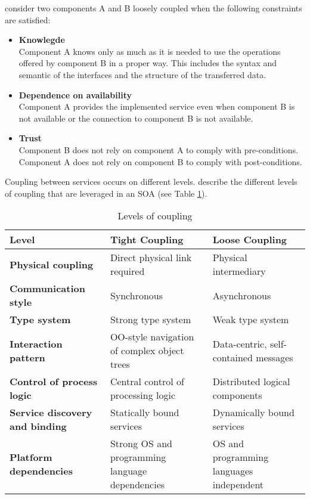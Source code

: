 \citet{Engels:2008nr} consider two components A and B loosely coupled when the following constraints are satisfied:
\begin{itemize}
	\item \textbf{Knowlegde}\\
	Component A knows only as much as it is needed to use the operations offered by component B in a proper way. This includes the syntax and semantic of the interfaces and the structure of the transferred data.
	\item \textbf{Dependence on availability}\\
	Component A provides the implemented service even when component B is not available or the connection to component B is not available.
	\item \textbf{Trust}\\
	Component B does not rely on component A to comply with pre-conditions. Component A does not rely on component B to comply with post-conditions.
\end{itemize}

Coupling between services occurs on different levels. \citet{Krafzig:2005zc} describe the different levels of coupling that are leveraged in an \ac{SOA} (see Table \ref{table:ch02_coupling}).

\begin{table}[htpb]
	\centering
	\begin{tabularx}{\textwidth}{@{} X X X @{}}
		\caption{Levels of coupling}\label{table:ch02_coupling}\\
		\toprule
		\bfseries Level & \bfseries Tight Coupling & \bfseries Loose Coupling\\
		\midrule
		\bfseries Physical coupling & Direct physical link required & Physical intermediary\\
		\midrule
		\bfseries Communication style & Synchronous & Asynchronous\\
		\midrule
		\bfseries Type system & Strong type system & Weak type system\\
		\midrule
		\bfseries Interaction pattern & OO-style navigation of complex object trees & Data-centric, self-contained messages\\
		\midrule
		\bfseries Control of process logic & Central control of processing logic & Distributed logical components\\
		\midrule
		\bfseries Service discovery and binding & Statically bound services & Dynamically bound services\\
		\midrule
		\bfseries Platform dependencies & Strong OS and programming language dependencies & OS and programming languages independent\\
		\bottomrule
	\end{tabularx}
\end{table}

